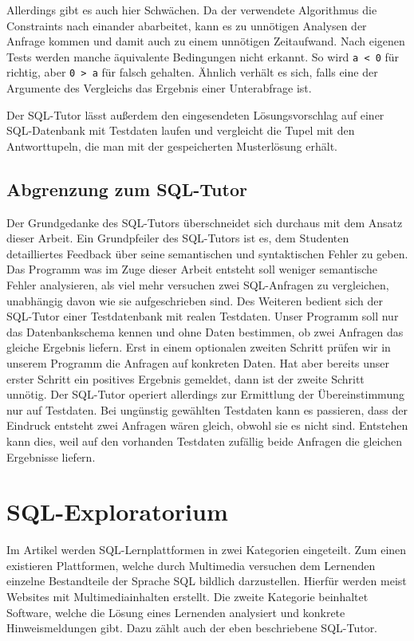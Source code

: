 Allerdings gibt es auch hier Schwächen. Da der verwendete Algorithmus die Constraints nach einander abarbeitet, kann es zu unnötigen Analysen der Anfrage kommen und damit auch zu einem unnötigen Zeitaufwand. Nach eigenen Tests werden manche äquivalente Bedingungen nicht erkannt. So wird \verb|a < 0| für richtig, aber \verb|0 > a| für falsch gehalten. Ähnlich verhält es sich, falls eine der Argumente des Vergleichs das Ergebnis einer Unterabfrage ist.

Der SQL-Tutor lässt außerdem den eingesendeten Lösungsvorschlag auf einer SQL-Datenbank mit Testdaten laufen und vergleicht die Tupel mit den Antworttupeln, die man mit der gespeicherten Musterlösung erhält.

\subsection*{Abgrenzung zum SQL-Tutor}

Der Grundgedanke des SQL-Tutors überschneidet sich durchaus mit dem Ansatz dieser Arbeit. Ein Grundpfeiler des SQL-Tutors ist es, dem Studenten detailliertes Feedback über seine semantischen und syntaktischen Fehler zu geben. Das Programm was im Zuge dieser Arbeit entsteht soll weniger semantische Fehler analysieren, als viel mehr versuchen zwei SQL-Anfragen zu vergleichen, unabhängig davon wie sie aufgeschrieben sind. Des Weiteren bedient sich der SQL-Tutor einer Testdatenbank mit realen Testdaten. Unser Programm soll nur das Datenbankschema kennen und ohne Daten bestimmen, ob zwei Anfragen das gleiche Ergebnis liefern. Erst in einem optionalen zweiten Schritt prüfen wir in unserem Programm die Anfragen auf konkreten Daten. Hat aber bereits unser erster Schritt ein positives Ergebnis gemeldet, dann ist der zweite Schritt unnötig. Der SQL-Tutor operiert allerdings zur Ermittlung der Übereinstimmung nur auf Testdaten. Bei ungünstig gewählten Testdaten kann es passieren, dass der Eindruck entsteht zwei Anfragen wären gleich, obwohl sie es nicht sind. Entstehen kann dies, weil auf den vorhanden Testdaten zufällig beide Anfragen die gleichen Ergebnisse liefern.

\section{SQL-Exploratorium}

Im Artikel \cite{explora1} werden SQL-Lernplattformen in zwei Kategorien eingeteilt. Zum einen existieren Plattformen, welche durch Multimedia versuchen dem Lernenden einzelne Bestandteile der Sprache SQL bildlich darzustellen. Hierfür werden meist Websites mit Multimediainhalten erstellt. Die zweite Kategorie beinhaltet Software, welche die Lösung eines Lernenden analysiert und konkrete Hinweismeldungen gibt. Dazu zählt auch der eben beschriebene SQL-Tutor.

